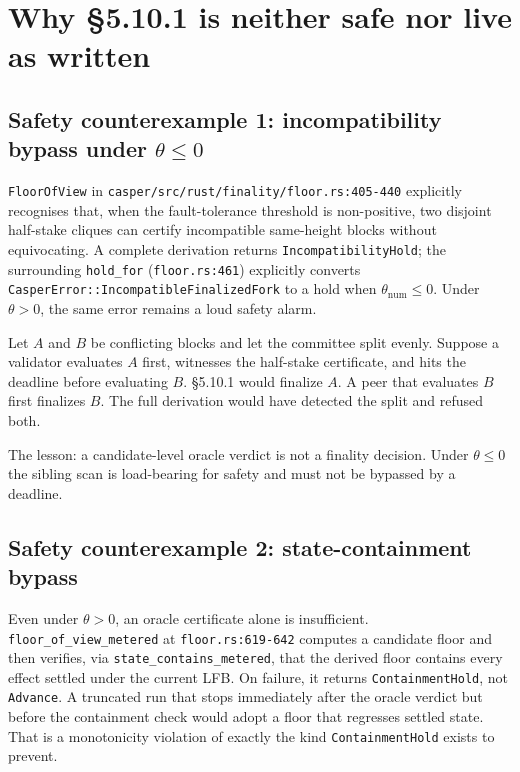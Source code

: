 \documentclass[11pt]{article}
\newcommand{\code}[1]{\texttt{#1}}
\begin{document}
\section{Why §5.10.1 is neither safe nor live as written}

\subsection{Safety counterexample 1: incompatibility bypass under
$\theta \le 0$}
\label{sec:cex-incompat}

\code{FloorOfView} in \code{casper/src/rust/finality/floor.rs:405-440}
explicitly recognises that, when the fault-tolerance threshold is
non-positive, two disjoint half-stake cliques can certify incompatible
same-height blocks without equivocating. A complete derivation returns
\code{IncompatibilityHold}; the surrounding \code{hold\_for}
(\code{floor.rs:461}) explicitly converts
\code{CasperError::IncompatibleFinalizedFork} to a hold when
$\theta_{\text{num}} \le 0$. Under $\theta > 0$, the same error remains a
loud safety alarm.

Let $A$ and $B$ be conflicting blocks and let the committee split evenly.
Suppose a validator evaluates $A$ first, witnesses the half-stake
certificate, and hits the deadline before evaluating $B$. §5.10.1 would
finalize $A$. A peer that evaluates $B$ first finalizes $B$. The full
derivation would have detected the split and refused both.

The lesson: a candidate-level oracle verdict is not a finality decision.
Under $\theta \le 0$ the sibling scan is load-bearing for safety and must
not be bypassed by a deadline.

\subsection{Safety counterexample 2: state-containment bypass}
\label{sec:cex-contain}

Even under $\theta > 0$, an oracle certificate alone is insufficient.
\code{floor\_of\_view\_metered} at \code{floor.rs:619-642} computes a
candidate floor and then verifies, via \code{state\_contains\_metered},
that the derived floor contains every effect settled under the current
LFB. On failure, it returns \code{ContainmentHold}, not \code{Advance}.
A truncated run that stops immediately after the oracle verdict but
before the containment check would adopt a floor that regresses settled
state. That is a monotonicity violation of exactly the kind
\code{ContainmentHold} exists to prevent.
\end{document}
